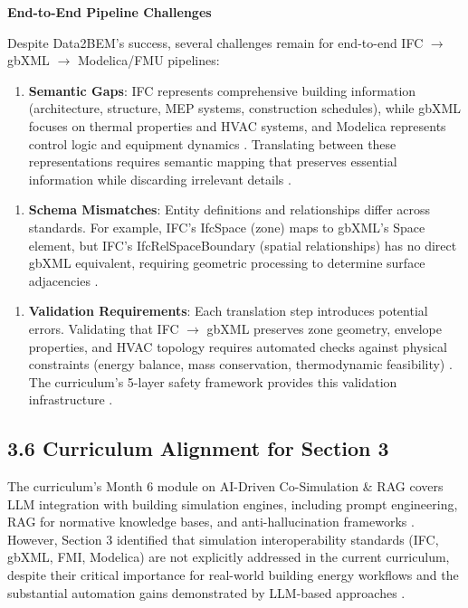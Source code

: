 \documentclass[12pt,a4paper]{article}
\begin{document}
\textbf{End-to-End Pipeline Challenges}

Despite Data2BEM's success, several challenges remain for end-to-end IFC $\rightarrow$ gbXML $\rightarrow$ Modelica/FMU pipelines:

\begin{enumerate}
  \item \textbf{Semantic Gaps}: IFC represents comprehensive building information (architecture, structure, MEP systems, construction schedules), while gbXML focuses on thermal properties and HVAC systems, and Modelica represents control logic and equipment dynamics \cite{ref113}. Translating between these representations requires semantic mapping that preserves essential information while discarding irrelevant details \cite{ref114}.
\end{enumerate}

\begin{enumerate}
  \item \textbf{Schema Mismatches}: Entity definitions and relationships differ across standards. For example, IFC's IfcSpace (zone) maps to gbXML's Space element, but IFC's IfcRelSpaceBoundary (spatial relationships) has no direct gbXML equivalent, requiring geometric processing to determine surface adjacencies \cite{ref115}.
\end{enumerate}

\begin{enumerate}
  \item \textbf{Validation Requirements}: Each translation step introduces potential errors. Validating that IFC $\rightarrow$ gbXML preserves zone geometry, envelope properties, and HVAC topology requires automated checks against physical constraints (energy balance, mass conservation, thermodynamic feasibility) \cite{ref116}. The curriculum's 5-layer safety framework provides this validation infrastructure \cite{ref117}.
\end{enumerate}

\subsection{3.6 Curriculum Alignment for Section 3}

The curriculum's Month 6 module on AI-Driven Co-Simulation \& RAG covers LLM integration with building simulation engines, including prompt engineering, RAG for normative knowledge bases, and anti-hallucination frameworks \cite{ref118}. However, Section 3 identified that simulation interoperability standards (IFC, gbXML, FMI, Modelica) are not explicitly addressed in the current curriculum, despite their critical importance for real-world building energy workflows and the substantial automation gains demonstrated by LLM-based approaches \cite{ref119}.
\end{document}
